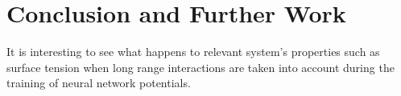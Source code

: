 \chapter{Conclusion and Further Work}
It is interesting to see what happens to relevant system's properties such as
surface tension when   long range interactions are taken into account during
the training of neural network potentials.
